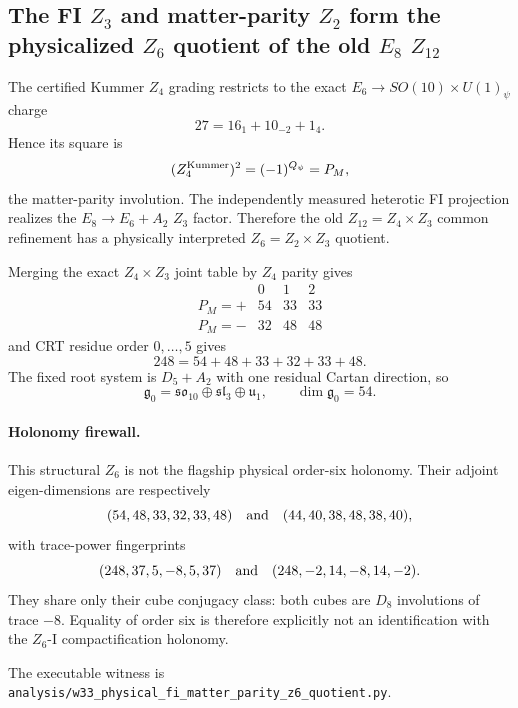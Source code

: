 \subsection*{The FI $Z_3$ and matter-parity $Z_2$ form the physicalized $Z_6$ quotient of the old $E_8$ $Z_{12}$}

The certified Kummer $Z_4$ grading restricts to the exact
$E_6\to SO(10)\times U(1)_\psi$ charge
\[
27=16_1+10_{-2}+1_4.
\]
Hence its square is
\[
(Z_4^{\rm Kummer})^2=(-1)^{Q_\psi}=P_M,
\]
the matter-parity involution.  The independently measured heterotic FI
projection realizes the $E_8\to E_6+A_2$ $Z_3$ factor.  Therefore the old
$Z_{12}=Z_4\times Z_3$ common refinement has a physically interpreted
$Z_6=Z_2\times Z_3$ quotient.

Merging the exact $Z_4\times Z_3$ joint table by $Z_4$ parity gives
\[
\begin{array}{c|ccc}
 &0&1&2\\\hline
P_M=+&54&33&33\\
P_M=-&32&48&48
\end{array}
\]
and CRT residue order $0,\dots,5$ gives
\[
\boxed{248=54+48+33+32+33+48.}
\]
The fixed root system is $D_5+A_2$ with one residual Cartan direction, so
\[
\boxed{\mathfrak g_0=
\mathfrak{so}_{10}\oplus\mathfrak{sl}_3\oplus\mathfrak u_1},
\qquad \dim\mathfrak g_0=54.
\]

\paragraph{Holonomy firewall.}
This structural $Z_6$ is not the flagship physical order-six holonomy.  Their
adjoint eigen-dimensions are respectively
\[
(54,48,33,32,33,48)
\quad\hbox{and}\quad
(44,40,38,48,38,40),
\]
with trace-power fingerprints
\[
(248,37,5,-8,5,37)
\quad\hbox{and}\quad
(248,-2,14,-8,14,-2).
\]
They share only their cube conjugacy class: both cubes are $D_8$ involutions
of trace $-8$.  Equality of order six is therefore explicitly not an
identification with the $Z_6$-I compactification holonomy.

The executable witness is
\texttt{analysis/w33\_physical\_fi\_matter\_parity\_z6\_quotient.py}.
